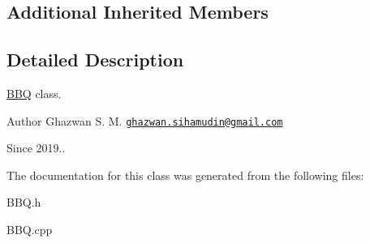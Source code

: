 \subsection*{Additional Inherited Members}


\subsection{Detailed Description}
\hyperlink{classBBQ}{B\+BQ} class.

\begin{DoxyAuthor}{Author}
Ghazwan S. M. \href{mailto:ghazwan.sihamudin@gmail.com}{\tt ghazwan.\+sihamudin@gmail.\+com} 
\end{DoxyAuthor}
\begin{DoxySince}{Since}
2019.. 
\end{DoxySince}


The documentation for this class was generated from the following files\+:\begin{DoxyCompactItemize}
\item 
B\+B\+Q.\+h\item 
B\+B\+Q.\+cpp\end{DoxyCompactItemize}
